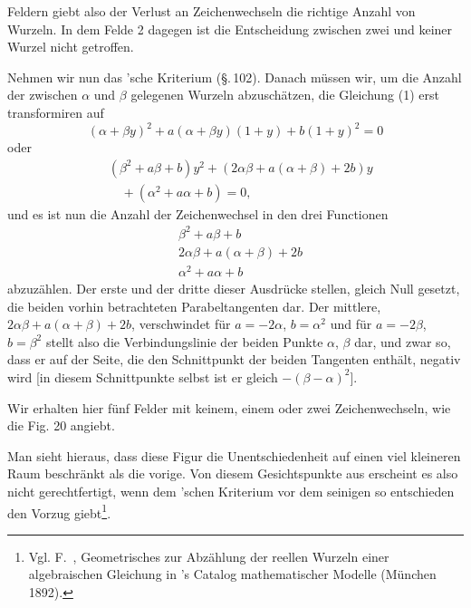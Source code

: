 Feldern giebt also der Verlust an Zeichenwechseln die richtige Anzahl von
Wurzeln. In dem Felde 2 dagegen ist die Entscheidung zwischen zwei und
keiner Wurzel nicht getroffen.

Nehmen wir nun das 'sche Kriterium (\S.\,102). Danach
müssen wir, um die Anzahl der zwischen $\alpha$ und $\beta$ gelegenen
Wurzeln abzuschätzen, die Gleichung (1) erst transformiren auf
\[
(\alpha+\beta y)^2+a(\alpha+\beta y)(1+y)+b(1+y)^2=0
\]
oder
\[
\begin{aligned}
&(\beta^2+a\beta+b)y^2+(2\alpha\beta+a(\alpha+\beta)+2b)y\\
&\quad{}+(\alpha^2+a\alpha+b)=0,
\end{aligned}
\]
und es ist nun die Anzahl der Zeichenwechsel in den drei Functionen
\[
\begin{aligned}
&\beta^2+a\beta+b\\
&2\alpha\beta+a(\alpha+\beta)+2b\\
&\alpha^2+a\alpha+b
\end{aligned}
\]
abzuzählen. Der erste und der dritte dieser Ausdrücke stellen, gleich Null
gesetzt, die beiden vorhin betrachteten Parabeltangenten dar. Der mittlere,
$2\alpha\beta+a(\alpha+\beta)+2b$, verschwindet für $a=-2\alpha$,
$b=\alpha^2$ und für $a=-2\beta$, $b=\beta^2$ stellt also die
Verbindungslinie der beiden Punkte $\alpha$, $\beta$ dar, und zwar so,
dass er auf der Seite, die den Schnittpunkt der beiden Tangenten enthält,
negativ wird [in diesem Schnittpunkte selbst ist er gleich
$-(\beta-\alpha)^2$].

Wir erhalten hier fünf Felder mit keinem, einem oder zwei
Zeichenwechseln, wie die Fig. 20 angiebt.

Man sieht hieraus, dass diese Figur die Unentschiedenheit auf einen viel
kleineren Raum beschränkt als die vorige. Von diesem Gesichtspunkte aus
erscheint es also nicht gerechtfertigt, wenn  dem
'schen Kriterium vor dem seinigen so entschieden
den Vorzug giebt\footnote{Vgl. F.\ , Geometrisches zur
Abzählung der reellen Wurzeln einer algebraischen Gleichung in
's Catalog mathematischer Modelle (München 1892).}.
